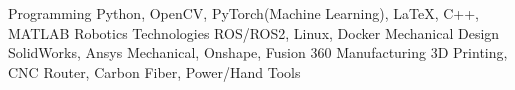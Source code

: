 

\begin{cvskills}
  \cvskill
  {Programming} %
  {Python, OpenCV, PyTorch(Machine Learning), LaTeX, C++, MATLAB} %
  \cvskill
  {Robotics Technologies}
  {ROS/ROS2, Linux, Docker}
  \cvskill
    {Mechanical Design} %
    {SolidWorks, Ansys Mechanical, Onshape, Fusion 360} %
  \cvskill
    {Manufacturing} %
    {3D Printing, CNC Router, Carbon Fiber, Power/Hand Tools} %
\end{cvskills}
